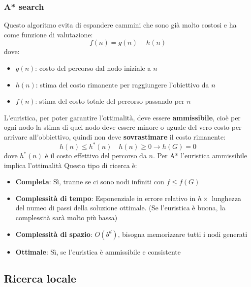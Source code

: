 \documentclass[a4paper]{article}
\begin{document}
\subsubsection{A* search}
Questo algoritmo evita di espandere cammini che sono già molto costosi e ha come
funzione di valutazione:
\[
  f(n) = g(n) + h(n)
\] 
dove:
\begin{itemize}
  \item \( g(n) \): costo del percorso dal nodo iniziale a \( n \)
  \item \( h(n) \): stima del costo rimanente per raggiungere l'obiettivo da \( n \)
  \item \( f(n) \): stima del costo totale del percorso passando per \( n \)
\end{itemize}
L'euristica, per poter garantire l'ottimalità, deve essere \textbf{ammissibile}, cioè
per ogni nodo la stima di quel nodo deve essere minore o uguale del vero costo per arrivare
all'obbiettivo, quindi non deve \textbf{sovrastimare} il costo rimanente:
\[
  h(n) \le h^*(n) \quad h(n) \ge 0 \to h(G) = 0
\] 
dove \( h^*(n) \) è il costo effettivo del percorso da \( n \).
\thm{}
{
  Per A* l'euristica ammissibile implica l'ottimalità
}
\noindent
Questo tipo di ricerca è:
\begin{itemize}
  \item \textbf{Completa}: Sì, tranne se ci sono nodi infiniti con \( f \le f(G) \) 
  \item \textbf{Complessità di tempo}: Esponenziale in errore relativo in \( h \times  \) 
    lunghezza del numeo di passi della soluzione ottimale. (Se l'euristica è buona, la
    complessità sarà molto più bassa)
  \item \textbf{Complessità di spazio}: \( O(b^d) \), bisogna memorizzare tutti i nodi
    generati
  \item \textbf{Ottimale}: Sì, se l'euristica è ammissibile e consistente
\end{itemize}

\subsection{Ricerca locale}
\end{document}
